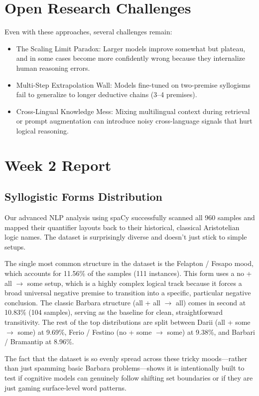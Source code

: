 \documentclass[11pt]{article}
\begin{document}
\section{Open Research Challenges}

Even with these approaches, several challenges remain:

\begin{itemize}
	\item The Scaling Limit Paradox: Larger models improve somewhat but plateau, and in some cases become more confidently wrong because they internalize human reasoning errors.
	\item Multi-Step Extrapolation Wall: Models fine-tuned on two-premise syllogisms fail to generalize to longer deductive chains (3--4 premises).
	\item Cross-Lingual Knowledge Mess: Mixing multilingual context during retrieval or prompt augmentation can introduce noisy cross-language signals that hurt logical reasoning.
\end{itemize}

\section{Week 2 Report}

\subsection{Syllogistic Forms Distribution}
Our advanced NLP analysis using spaCy successfully scanned all 960 samples and mapped their quantifier layouts back to their historical, classical Aristotelian logic names. The dataset is surprisingly diverse and doesn't just stick to simple setups.

The single most common structure in the dataset is the Felapton / Fesapo mood, which accounts for 11.56\% of the samples (111 instances). This form uses a no + all $\rightarrow$ some setup, which is a highly complex logical track because it forces a broad universal negative premise to transition into a specific, particular negative conclusion. The classic Barbara structure (all + all $\rightarrow$ all) comes in second at 10.83\% (104 samples), serving as the baseline for clean, straightforward transitivity. The rest of the top distributions are split between Darii (all + some $\rightarrow$ some) at 9.69\%, Ferio / Festino (no + some $\rightarrow$ some) at 9.38\%, and Barbari / Bramantip at 8.96\%.

The fact that the dataset is so evenly spread across these tricky moods---rather than just spamming basic Barbara problems---shows it is intentionally built to test if cognitive models can genuinely follow shifting set boundaries or if they are just gaming surface-level word patterns.
\end{document}
